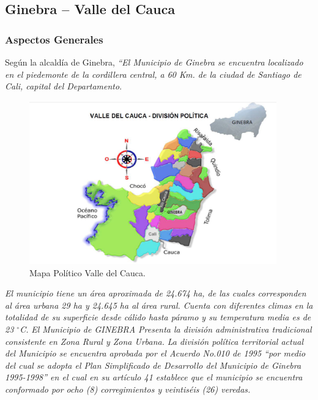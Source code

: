 \documentclass[12pt,letterpaper,openany]{book}
\newcommand{\grad}{$^{\circ}$}
\begin{document}
\subsection{Ginebra – Valle del Cauca}
\subsubsection{Aspectos Generales}
Según la alcaldía de Ginebra, \textit{“El Municipio de Ginebra se encuentra localizado en el piedemonte de la cordillera central, a 60 Km. de la ciudad de Santiago de Cali, capital del Departamento}.

\begin{figure}[H]
\begin{center}
\includegraphics[width=10.7cm]{./imagenes/mapa_politico}
\caption{Mapa Político Valle del Cauca.}
\end{center}
\end{figure}

\textit{El municipio tiene un área aproximada de 24.674 ha, de las cuales corresponden al área urbana 29 ha y 24.645 ha al área rural. Cuenta con diferentes climas en la totalidad de su superficie desde cálido hasta páramo y su temperatura media es de 23 \grad C.}
\vspace{5mm}\newline
\textit{El Municipio de GINEBRA Presenta la división administrativa tradicional consistente en Zona Rural y Zona Urbana.}
\vspace{5mm}\newline	
\textit{La división política territorial actual del Municipio se encuentra aprobada por el Acuerdo No.010 de 1995 “por medio del cual se adopta el Plan Simplificado de Desarrollo del Municipio de Ginebra 1995-1998” en el cual en su artículo 41 establece que el municipio se encuentra conformado por ocho (8) corregimientos y veintiséis (26) veredas.}
\end{document}
